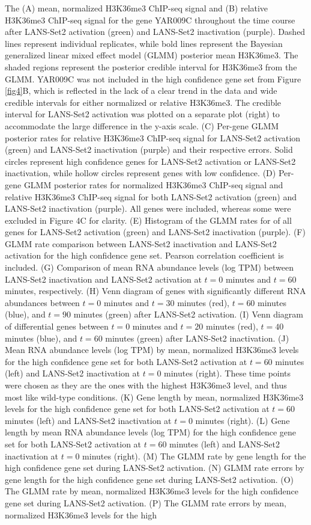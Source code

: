 \documentclass[11pt]{biorxiv}
\begin{document}
\noindent The (A) mean, normalized H3K36me3 ChIP-seq signal and (B) relative H3K36me3 ChIP-seq signal for the gene YAR009C throughout the time course after LANS-Set2 activation (green) and LANS-Set2 inactivation (purple). Dashed lines represent individual replicates, while bold lines represent the Bayesian generalized linear mixed effect model (GLMM) posterior mean H3K36me3. The shaded regions represent the posterior credible interval for H3K36me3 from the GLMM. YAR009C was not included in the high confidence gene set from Figure \ref{fig4}B, which is reflected in the lack of a clear trend in the data and wide credible intervals for either normalized or relative H3K36me3. The credible interval for LANS-Set2 activation was plotted on a separate plot (right) to accommodate the large difference in the y-axis scale. (C) Per-gene GLMM posterior rates for relative H3K36me3 ChIP-seq signal for LANS-Set2 activation (green) and LANS-Set2 inactivation (purple) and their respective errors. Solid circles represent high confidence genes for LANS-Set2 activation or LANS-Set2 inactivation, while hollow circles represent genes with low confidence. (D) Per-gene GLMM posterior rates for normalized H3K36me3 ChIP-seq signal and relative H3K36me3 ChIP-seq signal for both LANS-Set2 activation (green) and LANS-Set2 inactivation (purple). All genes were included, whereas some were excluded in Figure 4C for clarity. (E) Histogram of the GLMM rates for of all genes for LANS-Set2 activation (green) and LANS-Set2 inactivation (purple). (F) GLMM rate comparison between LANS-Set2 inactivation and LANS-Set2 activation for the high confidence gene set. Pearson correlation coefficient is included. (G) Comparison of mean RNA abundance levels (log TPM) between LANS-Set2 inactivation and LANS-Set2 activation at $t=0$ minutes and $t=60$ minutes, respectively. (H) Venn diagram of genes with significantly different RNA abundances between $t=0$ minutes and $t=30$ minutes (red), $t=60$ minutes (blue), and $t=90$ minutes (green) after LANS-Set2 activation. (I) Venn diagram of differential genes between $t=0$ minutes and $t=20$ minutes (red), $t=40$ minutes (blue), and $t=60$ minutes (green) after LANS-Set2 inactivation. (J) Mean RNA abundance levels (log TPM) by mean, normalized H3K36me3 levels for the high confidence gene set for both LANS-Set2 activation at $t=60$ minutes (left) and LANS-Set2 inactivation at $t=0$ minutes (right). These time points were chosen as they are the ones with the highest H3K36me3 level, and thus most like wild-type conditions. (K) Gene length by mean, normalized H3K36me3 levels for the high confidence gene set for both LANS-Set2 activation at $t=60$ minutes (left) and LANS-Set2 inactivation at $t=0$ minutes (right). (L) Gene length by mean RNA abundance levels (log TPM) for the high confidence gene set for both LANS-Set2 activation at $t=60$ minutes (left) and LANS-Set2 inactivation at $t=0$ minutes (right). (M)  The GLMM rate by gene length for the high confidence gene set during LANS-Set2 activation. (N) GLMM rate errors by gene length for the high confidence gene set during LANS-Set2 activation. (O) The GLMM rate by mean, normalized H3K36me3 levels for the high confidence gene set during LANS-Set2 activation. (P) The GLMM rate errors by mean, normalized H3K36me3 levels for the high 
\end{document}

